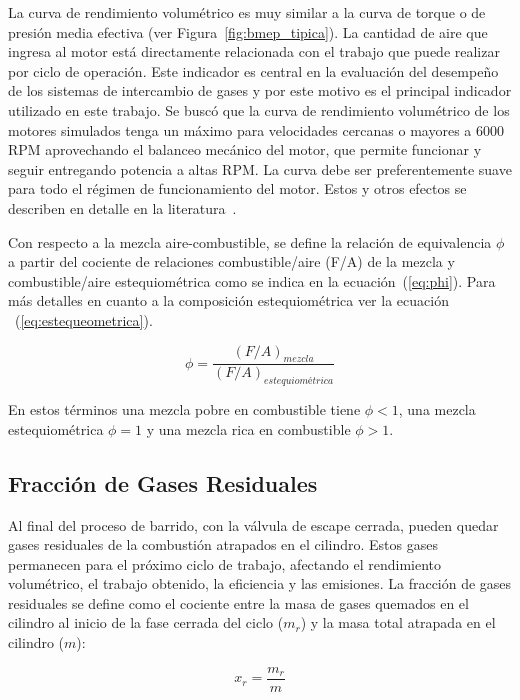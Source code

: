 La curva de rendimiento volumétrico es muy similar a la curva de torque o de
presión media efectiva (ver Figura~\ref{fig:bmep_tipica}).
%
La cantidad de aire que ingresa al motor está directamente relacionada con el
trabajo que puede realizar por ciclo de operación.
%
Este indicador es central en la evaluación del desempeño de los sistemas de
intercambio de gases y por este motivo es el principal indicador utilizado en
este trabajo.
%
Se buscó que la curva de rendimiento volumétrico de los motores simulados tenga
un máximo para velocidades cercanas o mayores a 6000 RPM aprovechando el
balanceo mecánico del motor, que permite funcionar y seguir entregando potencia
a altas RPM.
%
La curva debe ser preferentemente suave para todo el régimen de funcionamiento
del motor.
%
Estos y otros efectos se describen en detalle en la
literatura~\parencite{heywood}.
%

Con respecto a la mezcla aire-combustible, se define la relación
de equivalencia $\phi$ a partir del cociente de relaciones combustible/aire (F/A)
de la mezcla y combustible/aire estequiométrica como se indica en la
ecuación~(\ref{eq:phi}).
%
Para más detalles en cuanto a la composición estequiométrica ver la ecuación
~(\ref{eq:estequeometrica}).

\begin{equation}
  \label{eq:phi}
  \phi = \frac{(F/A)_{mezcla}}{(F/A)_{estequiométrica}}
\end{equation}

En estos términos una mezcla pobre en combustible tiene $\phi < 1$, una mezcla
estequiométrica $\phi=1$ y una mezcla rica en combustible $\phi > 1$.


\subsection{Fracción de Gases Residuales}
%
Al final del proceso de barrido, con la válvula de escape cerrada,
pueden quedar gases residuales de la combustión atrapados en el cilindro.
%
Estos gases permanecen para el próximo ciclo de trabajo, afectando el
rendimiento volumétrico, el trabajo obtenido, la eficiencia y las emisiones.
%
La fracción de gases residuales se define como el cociente entre la masa de
gases quemados en el cilindro  al inicio de la fase cerrada del ciclo ($m_{r}$)
y la masa total atrapada en el cilindro ($m$):


\begin{equation}
    x_{r} = \frac{m_{r}}{m}
\end{equation}

